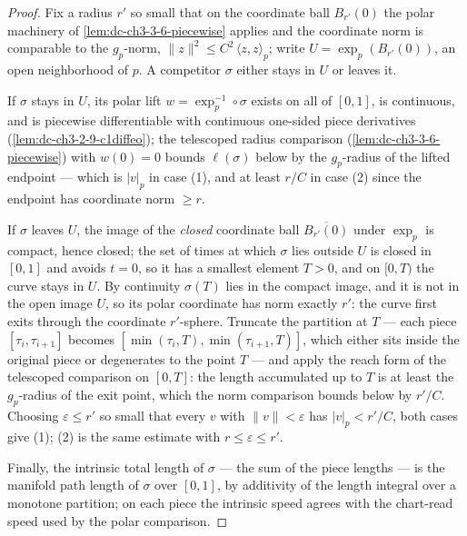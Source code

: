 \begin{proof}
  \sketch

  Fix a radius $r'$ so small that on the coordinate ball $B_{r'}(0)$ the
  polar machinery of \cref{lem:dc-ch3-3-6-piecewise} applies and the
  coordinate norm is comparable to the $g_p$-norm, $\|z\|^2\le C^2\,
  \langle z,z\rangle_p$; write $U=\exp_p(B_{r'}(0))$, an open neighborhood of
  $p$. A competitor $\sigma$ either stays in $U$ or leaves it.

  If $\sigma$ stays in $U$, its polar lift $w=\exp_p^{-1}\circ\sigma$ exists
  on all of $[0,1]$, is continuous, and is piecewise differentiable with
  continuous one-sided piece derivatives (\cref{lem:dc-ch3-2-9-c1diffeo});
  the telescoped radius comparison (\cref{lem:dc-ch3-3-6-piecewise}) with
  $w(0)=0$ bounds $\ell(\sigma)$ below by the $g_p$-radius of the lifted
  endpoint — which is $|v|_p$ in case (1), and at least $r/C$ in case (2)
  since the endpoint has coordinate norm $\ge r$.

  If $\sigma$ leaves $U$, the image of the \emph{closed} coordinate ball
  $\overline{B_{r'}(0)}$ under $\exp_p$ is compact, hence closed; the set of
  times at which $\sigma$ lies outside $U$ is closed in $[0,1]$ and avoids
  $t=0$, so it has a smallest element $T>0$, and on $[0,T)$ the curve stays
  in $U$. By continuity $\sigma(T)$ lies in the compact image, and it is not
  in the open image $U$, so its polar coordinate has norm exactly $r'$: the
  curve first exits through the coordinate $r'$-sphere. Truncate the
  partition at $T$ — each piece $[\tau_i,\tau_{i+1}]$ becomes
  $[\min(\tau_i,T),\min(\tau_{i+1},T)]$, which either sits inside the
  original piece or degenerates to the point $T$ — and apply the reach form
  of the telescoped comparison on $[0,T]$: the length accumulated up to $T$
  is at least the $g_p$-radius of the exit point, which the norm comparison
  bounds below by $r'/C$. Choosing $\varepsilon\le r'$ so small that every
  $v$ with $\|v\|<\varepsilon$ has $|v|_p<r'/C$, both cases give (1); (2) is
  the same estimate with $r\le\varepsilon\le r'$.

  Finally, the intrinsic total length of $\sigma$ — the sum of the piece
  lengths — is the manifold path length of $\sigma$ over $[0,1]$, by
  additivity of the length integral over a monotone partition; on each piece
  the intrinsic speed agrees with the chart-read speed used by the polar
  comparison.
\end{proof}

